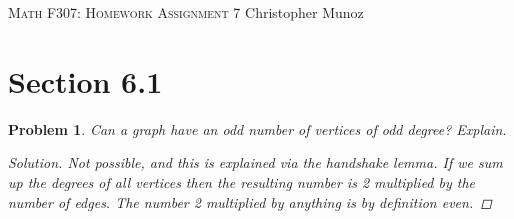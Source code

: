 \documentclass[12pt]{article}
\newtheorem{problem}{Problem}
\begin{document}
\small
\noindent \textsc{Math F307: Homework Assignment 7} \hfill Christopher Munoz

\normalsize
\bigskip
\section*{Section 6.1}

\setcounter{problem}{7}
\begin{problem}
Can a graph have an odd number of vertices of odd degree? Explain.
\begin{proof}[Solution]
  Not possible, and this is explained via the handshake lemma. If we sum up the degrees of all vertices then the resulting number is 2 multiplied by the number of edges. The number 2 multiplied by anything is by definition even.
\end{proof}
\end{problem}
\end{document}
